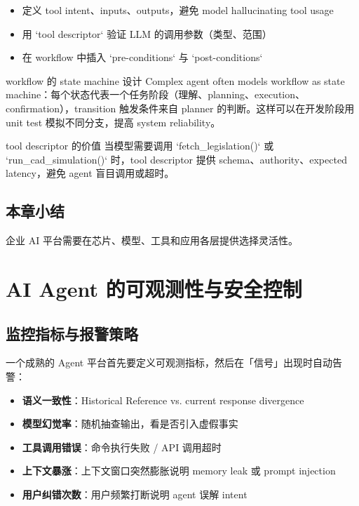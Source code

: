 \documentclass[a4paper]{article}
\begin{document}
\begin{itemize}
    \item 定义 tool intent、inputs、outputs，避免 model hallucinating tool usage
    \item 用 `tool descriptor` 验证 LLM 的调用参数（类型、范围）
    \item 在 workflow 中插入 `pre-conditions` 与 `post-conditions`
\end{itemize}

\begin{knowledgebox}{workflow 的 state machine 设计}
Complex agent often models workflow as state machine：每个状态代表一个任务阶段（理解、planning、execution、confirmation），transition 触发条件来自 planner 的判断。这样可以在开发阶段用 unit test 模拟不同分支，提高 system reliability。
\end{knowledgebox}
\begin{knowledgebox}{tool descriptor 的价值}
当模型需要调用 `fetch\_legislation()` 或 `run\_cad\_simulation()` 时，tool descriptor 提供 schema、authority、expected latency，避免 agent 盲目调用或超时。
\end{knowledgebox}

\subsection{本章小结}

企业 AI 平台需要在芯片、模型、工具和应用各层提供选择灵活性。

\section{AI Agent 的可观测性与安全控制}

\subsection{监控指标与报警策略}

一个成熟的 Agent 平台首先要定义可观测指标，然后在「信号」出现时自动告警：

\begin{itemize}
    \item \textbf{语义一致性}：Historical Reference vs. current response divergence
    \item \textbf{模型幻觉率}：随机抽查输出，看是否引入虚假事实
    \item \textbf{工具调用错误}：命令执行失败 / API 调用超时
    \item \textbf{上下文暴涨}：上下文窗口突然膨胀说明 memory leak 或 prompt injection
    \item \textbf{用户纠错次数}：用户频繁打断说明 agent 误解 intent
\end{itemize}
\end{document}
